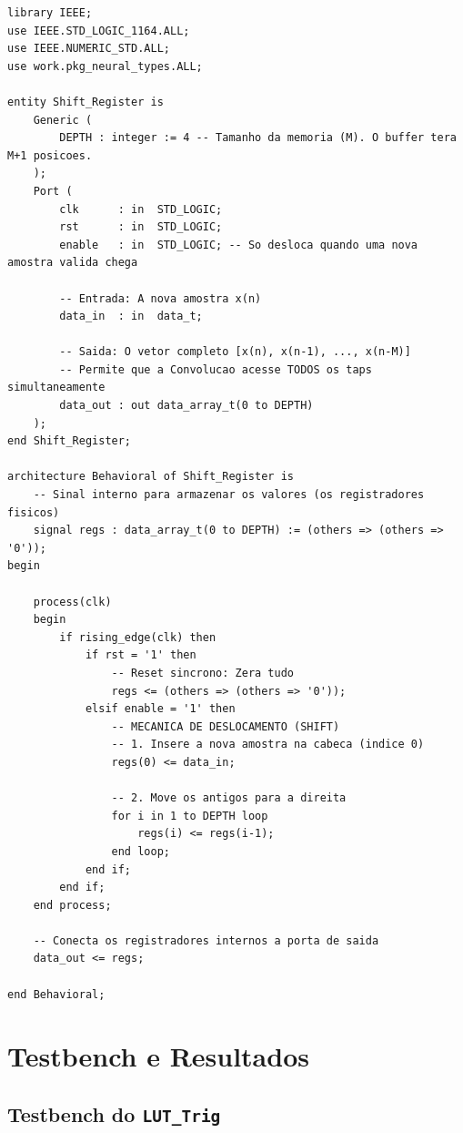 \documentclass[a4paper,12pt]{article}
\begin{document}
\begin{lstlisting}[style=vhdlstyle,
    caption={C\'odigo VHDL do \texttt{Shift\_Register}.},
    label={lst:shift_reg}]
library IEEE;
use IEEE.STD_LOGIC_1164.ALL;
use IEEE.NUMERIC_STD.ALL;
use work.pkg_neural_types.ALL;

entity Shift_Register is
    Generic (
        DEPTH : integer := 4 -- Tamanho da memoria (M). O buffer tera M+1 posicoes.
    );
    Port (
        clk      : in  STD_LOGIC;
        rst      : in  STD_LOGIC;
        enable   : in  STD_LOGIC; -- So desloca quando uma nova amostra valida chega

        -- Entrada: A nova amostra x(n)
        data_in  : in  data_t;

        -- Saida: O vetor completo [x(n), x(n-1), ..., x(n-M)]
        -- Permite que a Convolucao acesse TODOS os taps simultaneamente
        data_out : out data_array_t(0 to DEPTH)
    );
end Shift_Register;

architecture Behavioral of Shift_Register is
    -- Sinal interno para armazenar os valores (os registradores fisicos)
    signal regs : data_array_t(0 to DEPTH) := (others => (others => '0'));
begin

    process(clk)
    begin
        if rising_edge(clk) then
            if rst = '1' then
                -- Reset sincrono: Zera tudo
                regs <= (others => (others => '0'));
            elsif enable = '1' then
                -- MECANICA DE DESLOCAMENTO (SHIFT)
                -- 1. Insere a nova amostra na cabeca (indice 0)
                regs(0) <= data_in;

                -- 2. Move os antigos para a direita
                for i in 1 to DEPTH loop
                    regs(i) <= regs(i-1);
                end loop;
            end if;
        end if;
    end process;

    -- Conecta os registradores internos a porta de saida
    data_out <= regs;

end Behavioral;
\end{lstlisting}


\section{Testbench e Resultados}

\subsection{Testbench do \texttt{LUT\_Trig}}
\end{document}

